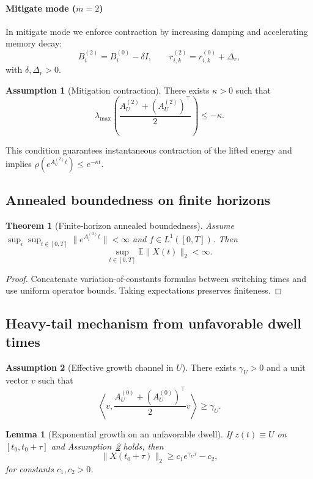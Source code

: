 \documentclass[12pt,a4paper]{article}
\newtheorem{theorem}{Theorem}
\newtheorem{lemma}{Lemma}
\theoremstyle{definition}
\newtheorem{assumption}{Assumption}
\theoremstyle{remark}
\begin{document}
\paragraph{Mitigate mode ($m=2$)}
In mitigate mode we enforce contraction by increasing damping and accelerating
memory decay:
\[
B_i^{(2)} = B_i^{(0)} - \delta I, \qquad
r_{i,k}^{(2)} = r_{i,k}^{(0)} + \Delta_r,
\]
with $\delta,\Delta_r>0$.

\begin{assumption}[Mitigation contraction]
	\label{ass:mitigation_contraction}
	There exists $\kappa>0$ such that
	\[
	\lambda_{\max}\!\left(
	\frac{A_U^{(2)} + (A_U^{(2)})^\top}{2}
	\right)
	\le -\kappa .
	\]
\end{assumption}

This condition guarantees instantaneous contraction of the lifted energy and
implies $\rho(e^{A_U^{(2)} t})\le e^{-\kappa t}$.


\subsection{Annealed boundedness on finite horizons}
\label{subsec:annealed}

\begin{theorem}[Finite-horizon annealed boundedness]
	\label{thm:annealed}
	Assume $\sup_i \sup_{t\in[0,T]}\|e^{A_i^{(0)}t}\|<\infty$ and $f\in L^1([0,T])$.
	Then
	\[
	\sup_{t\in[0,T]} \mathbb E \|X(t)\|_2 < \infty .
	\]
\end{theorem}

\begin{proof}
	Concatenate variation-of-constants formulas between switching times and use
	uniform operator bounds. Taking expectations preserves finiteness.
\end{proof}
\subsection{Heavy-tail mechanism from unfavorable dwell times}
\label{subsec:heavy_tail}

\begin{assumption}[Effective growth channel in $U$]
	\label{ass:growth_channel}
	There exists $\gamma_U>0$ and a unit vector $v$ such that
	\[
	\left\langle v, \frac{A_U^{(0)}+(A_U^{(0)})^\top}{2} v \right\rangle \ge \gamma_U .
	\]
\end{assumption}

\begin{lemma}[Exponential growth on an unfavorable dwell]
	\label{lem:exp_growth}
	If $z(t)\equiv U$ on $[t_0,t_0+\tau]$ and Assumption~\ref{ass:growth_channel}
	holds, then
	\[
	\|X(t_0+\tau)\|_2 \ge c_1 e^{\gamma_U \tau} - c_2 ,
	\]
	for constants $c_1,c_2>0$.
\end{lemma}
\end{document}
